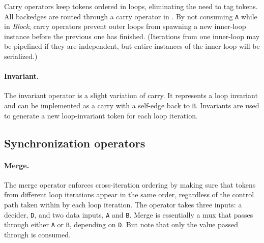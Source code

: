 Carry operators keep tokens ordered in loops, eliminating the need to tag tokens.
%
All backedges are routed through a carry operator in \riptide.
%
% 
By not consuming {\tt A} while in {\em Block}, carry operators prevent
outer loops from spawning a new inner-loop instance before the
previous one has finished.
%
(Iterations from one inner-loop may be pipelined if they are independent, but entire instances of the inner loop will be serialized.)

\paragraph{Invariant.}
The invariant operator is a slight variation of carry.
%
It represents a loop invariant and can be implemented as a carry with a self-edge back to {\tt B}.
%
Invariants are used to generate a new loop-invariant token for each loop iteration.

%

\subsection{Synchronization operators}

\paragraph{Merge.}
The merge operator enforces cross-iteration ordering by making sure that tokens from different loop iterations
appear in the same order, regardless of the control path taken within by each loop iteration.
% 
The operator takes three inputs: a decider, {\tt D}, and two data inputs, {\tt A} and {\tt B}.
%
Merge is essentially a mux that passes through either {\tt A} or {\tt B}, depending on {\tt D}.
%
But note that only the value passed through is consumed.

